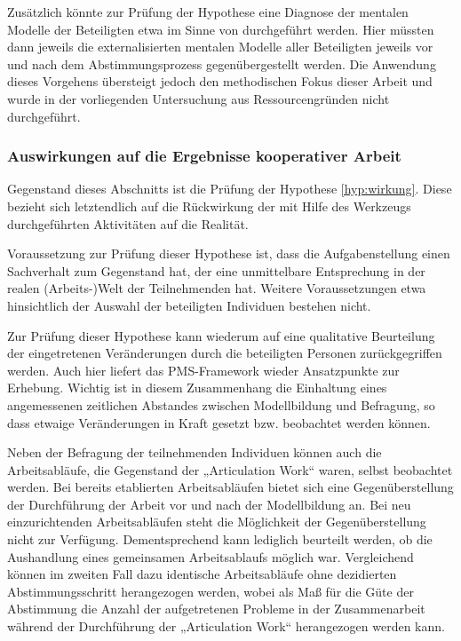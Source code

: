 Zusätzlich könnte zur Prüfung der Hypothese eine Diagnose der mentalen Modelle der Beteiligten etwa im Sinne von \citep{Ifenthaler06} durchgeführt werden. Hier müssten dann jeweils die externalisierten mentalen Modelle aller Beteiligten jeweils vor und nach dem Abstimmungsprozess gegenübergestellt werden. Die Anwendung dieses Vorgehens übersteigt jedoch den methodischen Fokus dieser Arbeit und wurde in der vorliegenden Untersuchung aus Ressourcengründen nicht durchgeführt.


\subsubsection{Auswirkungen auf die Ergebnisse kooperativer Arbeit} %
\label{ssub:auswirkungen_auf_die_ergebnisse_kooperativer_arbeit}

Gegenstand dieses Abschnitts ist die Prüfung der Hypothese \ref{hyp:wirkung}. Diese bezieht sich letztendlich auf die Rückwirkung der mit Hilfe des Werkzeugs durchgeführten Aktivitäten auf die Realität.

Voraussetzung zur Prüfung dieser Hypothese ist, dass die Aufgabenstellung einen Sachverhalt zum Gegenstand hat, der eine unmittelbare Entsprechung in der realen (Arbeits-)Welt der Teilnehmenden hat. Weitere Voraussetzungen etwa hinsichtlich der Auswahl der beteiligten Individuen bestehen nicht.

Zur Prüfung dieser Hypothese kann wiederum auf eine qualitative Beurteilung der eingetretenen Veränderungen durch die beteiligten Personen zurückgegriffen werden. Auch hier liefert das \gls{PMS}-Framework \citep{Sedera02} wieder Ansatzpunkte zur Erhebung. Wichtig ist in diesem Zusammenhang die Einhaltung eines angemessenen zeitlichen Abstandes zwischen Modellbildung und Befragung, so dass etwaige Veränderungen in Kraft gesetzt bzw. beobachtet werden können.

Neben der Befragung der teilnehmenden Individuen können auch die Arbeitsabläufe, die Gegenstand der „Articulation Work“ waren, selbst beobachtet werden. Bei bereits etablierten Arbeitsabläufen bietet sich eine Gegenüberstellung der Durchführung der Arbeit vor und nach der Modellbildung an. Bei neu einzurichtenden Arbeitsabläufen steht die Möglichkeit der Gegenüberstellung nicht zur Verfügung. Dementsprechend kann lediglich beurteilt werden, ob die Aushandlung eines gemeinsamen Arbeitsablaufs möglich war. Vergleichend können im zweiten Fall dazu identische Arbeitsabläufe ohne dezidierten Abstimmungsschritt herangezogen werden, wobei als Maß für die Güte der Abstimmung die Anzahl der aufgetretenen Probleme in der Zusammenarbeit während der Durchführung der „Articulation Work“ herangezogen werden kann.

